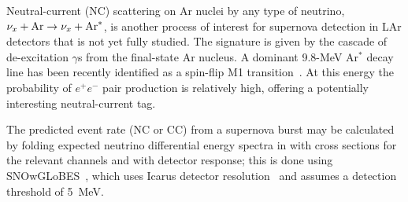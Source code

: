 
Neutral-current (NC) scattering on Ar nuclei by any type of neutrino, $\nu_x + {\rm Ar} \rightarrow \nu_x + {\rm Ar}^*$, is another process of interest for supernova detection in LAr detectors that is not yet fully studied. The signature is given by the cascade of de-excitation $\gamma$s from the final-state Ar nucleus. A dominant 9.8-MeV Ar$^*$ decay line has been recently identified as a spin-flip M1 transition~\cite{Hayes}.   At this energy the probability of $e^+e^-$ pair production is relatively high, offering a potentially interesting neutral-current tag.

The predicted event rate (NC or CC) from a supernova burst may be calculated by
folding expected neutrino differential energy spectra in with cross
sections for the relevant channels and with detector response; this is done using SNOwGLoBES~\cite{snowglobes}, which uses Icarus detector resolution~\cite{Amoruso:2003sw} and assumes a detection threshold of 5~MeV.

